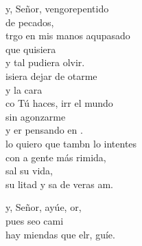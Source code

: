 \begin{cancion}%
	y, Señor, vengorepentido \\
	de  pecados,\\
	trgo en mis manos aqupasado\\
	que  quisiera \\
	y tal  pudiera olvir.\\
	\jump
	isiera dejar de otarme \\
	y  la cara\\
	co Tú haces, irr el mundo\\
	sin agonzarme \\
	y er pensando en .\\
	\jump
	lo quiero que tambn lo intentes\\
	con a gente más rimida, \\
	sal su vida,\\
	su litad y sa de veras am.\jump\\
	\begin{chorus}%
		y, Señor, ayúe, or,  \\
		pues seo cami\\
		hay miendas que elr, guíe.\jump\\
	\end{chorus}%
	\jump
\end{cancion}%

